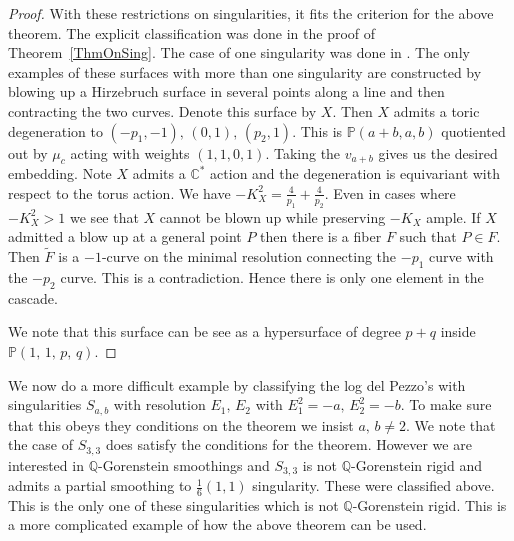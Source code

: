 \documentclass[12pt]{amsbook}
\theoremstyle{plain}
\newcommand{\ldp}{log del Pezzo}
\newcommand{\mb}[1]{\mathbb{#1}}
\begin{document}
\begin{proof}
With these restrictions on singularities, it fits the criterion for the above theorem. The explicit classification was done in the proof of Theorem~\ref{ThmOnSing}. The case of one singularity was done in \cite{CaveyPrince}. The only examples of these surfaces with more than one singularity are constructed by blowing up a Hirzebruch surface in several points along a line and then contracting the two curves. Denote this surface by $X$. Then $X$ admits a toric degeneration to $(-p_1, -1), \, (0, 1), \, (p_2, 1)$. This is $\mb{P}(a+b, a, b)$ quotiented out by $\mu_c$ acting with weights $(1,1,0,1)$. Taking the $v_{a+b}$ gives us the desired embedding. Note $X$ admits a $\mb{C}^*$ action and the degeneration is equivariant with respect to the torus action. We have $-K_X^2 = \frac{4}{p_1} + \frac{4}{p_2}$. Even in cases where $-K_X^2 > 1$ we see that $X$ cannot be blown up while preserving $-K_X$ ample. If $X$ admitted a blow up at a general point $P$ then there is a fiber $F$ such that $P \in F$. Then $\widetilde F$ is a $-1$-curve on the minimal resolution connecting the $-p_1$ curve with the $-p_2$ curve. This is a contradiction. Hence there is only one element in the cascade.



We note that this surface can be see as a hypersurface of degree $p+q$ inside $\mb{P}(1,\,1,\,p,\,q)$.

\end{proof}
We now do a more difficult example by classifying the \ldp's with singularities $S_{a,b}$ with resolution $E_1, \, E_2$ with $E_1^2 = -a,\, E_2^2 = -b$. To make sure that this obeys they conditions on the theorem we insist $a, \, b \neq 2$. We note that the case of $S_{3,3}$ does satisfy the conditions for the theorem. However we are interested in $\mb{Q}$-Gorenstein smoothings and $S_{3,3}$ is not $\mb{Q}$-Gorenstein rigid and admits a partial smoothing to $\frac{1}{6}(1,1)$ singularity. These were classified above. This is the only one of these singularities which is not $\mb{Q}$-Gorenstein rigid. This is a more complicated example of how the above theorem can be used.
\end{document}
